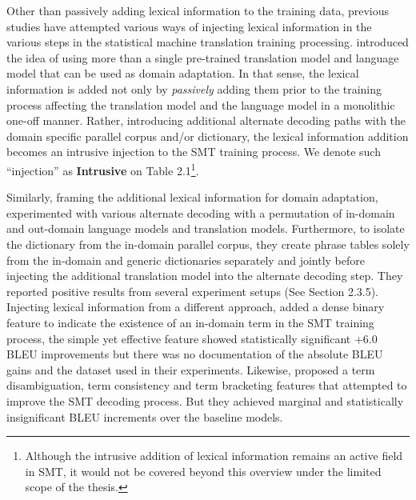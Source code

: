 Other than passively adding lexical information to the training data, previous studies have attempted various ways of injecting lexical information in the various steps in the statistical machine translation training processing. \cite{koehn2007experiments} introduced the idea of using more than a single pre-trained translation model and language model that can be used as domain adaptation. In that sense, the lexical information is added not only by \textit{passively} adding them prior to the training process affecting the translation model and the language model in a monolithic one-off manner. Rather, introducing additional alternate decoding paths with the domain specific parallel corpus and/or dictionary, the lexical information addition becomes an intrusive injection to the SMT training process. We denote such ``injection'' as \textbf{Intrusive} on Table 2.1\footnote{Although the intrusive addition of lexical information remains an active field in SMT, it would not be covered beyond this overview under the limited scope of the thesis.}.

Similarly, framing the additional lexical information for domain adaptation, \cite{wu2008domain} experimented with various alternate decoding with a permutation of in-domain and out-domain language models and translation models. Furthermore, to isolate the dictionary from the in-domain parallel corpus, they create phrase tables solely from the in-domain and generic dictionaries separately and jointly before injecting the additional translation model into the alternate decoding step. They reported positive results from several experiment setups (See Section 2.3.5). Injecting lexical information from a different approach, \cite{skadicnvs2013application} added a dense binary feature to indicate the existence of an in-domain term in the SMT training process, the simple yet effective feature showed statistically significant +6.0 BLEU improvements but there was no documentation of the absolute BLEU gains and the dataset used in their experiments. Likewise, \cite{meng2014} proposed a term disambiguation, term consistency and term bracketing features that attempted to improve the SMT decoding process. But they achieved marginal and statistically insignificant BLEU increments over the baseline models. 

